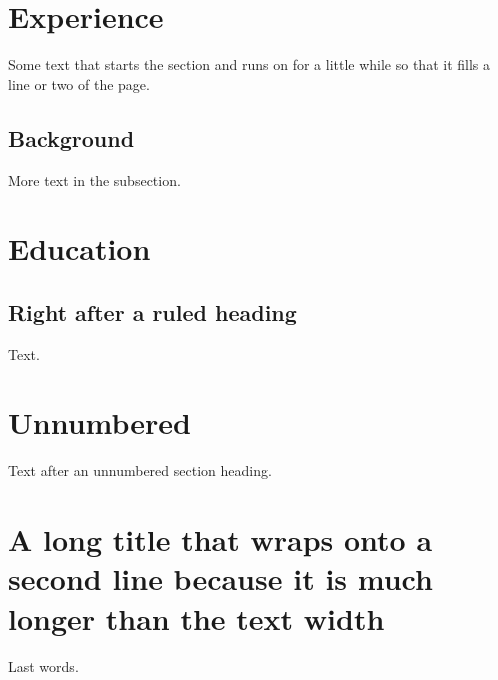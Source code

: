 \documentclass[11pt]{article}
\begin{document}
\section{Experience}
Some text that starts the section and runs on for a little while so that it fills a line or two of the page.

\subsection{Background}
More text in the subsection.
\section{Education}
\subsection{Right after a ruled heading}
Text.
\section*{Unnumbered}
Text after an unnumbered section heading.
\section{A long title that wraps onto a second line because it is much longer than the text width}
Last words.
\end{document}
